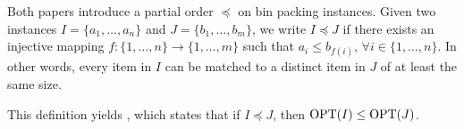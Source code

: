 Both papers introduce a partial order $\preceq$ on
bin packing instances. Given two instances
$I=\{a_1,\ldots,a_n\}$ and $J=\{b_1,\ldots,b_m\}$, we write $I\preceq J$ if there exists an injective mapping
$
    f:\{1,\ldots,n\}\rightarrow\{1,\ldots,m\}
$
such that
$
    a_i\leq b_{f(i)},\,
    \forall i\in\{1,\ldots,n\}.
$
In other words, every item in $I$ can be matched
to a distinct item in $J$ of at least the same size.

This definition yields , which states that
if $I\preceq J$, then $\operatorname{OPT}(I)\leq\operatorname{OPT}(J)$.







